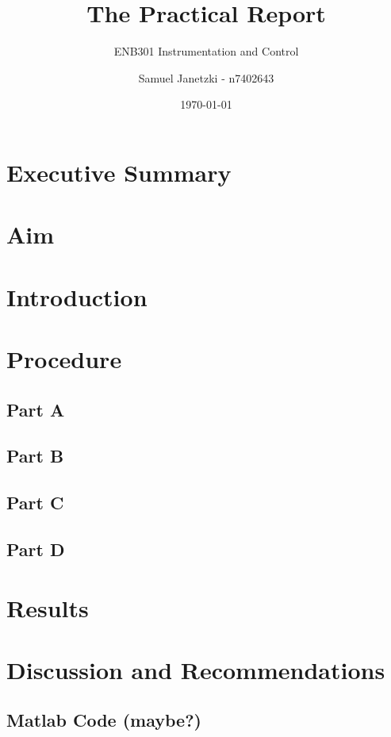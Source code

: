 \documentclass{scrartcl}
\begin{document}
\title{The Practical Report}
\small\subtitle{ENB301 Instrumentation and Control}
\author{Samuel Janetzki - n7402643}
\date{\today}
\maketitle

	\section{Executive Summary}
		
	\tableofcontents
		
	\listoffigures
		
    \section{Aim}
		
    \section{Introduction}
		
    \section{Procedure}
		
		\subsection{Part A}
			
		\subsection{Part B}
			
		\subsection{Part C}
			
		\subsection{Part D}
			
	\section{Results}
		
	\section{Discussion and Recommendations}
		
	\begin{appendices}
		
		\section{Matlab Code (maybe?)}
			
	\end{appendices}
	
	\begin{thebibliography}{9}
		
	\end{thebibliography}
\end{document}
